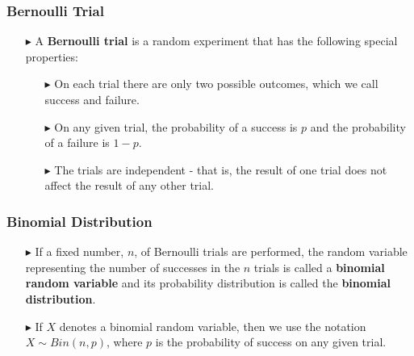\documentclass[12pt]{beamer}
\begin{document}
\begin{frame}
	\frametitle{Bernoulli Trial}
	
	\begin{itemize}
		\item[\color{blue}$\blacktriangleright$] A \textbf{Bernoulli trial} is a random experiment that has the following special properties:
		\begin{itemize}
			\item[\color{blue}$\blacktriangleright$] On each trial there are only two possible outcomes, which we call success and failure.
			\item[\color{blue}$\blacktriangleright$] On any given trial, the probability of a success is $p$ and the probability of a failure is $1 - p$.
			\item[\color{blue}$\blacktriangleright$] The trials are independent - that is, the result of one trial does not affect the result of any other trial.
		\end{itemize}
	\end{itemize}
	
\end{frame}

\begin{frame}
	\frametitle{Binomial Distribution}
	
	\begin{itemize}
		\item[\color{blue}$\blacktriangleright$] If a fixed number, $n$, of Bernoulli trials are performed, the random variable representing the number of successes in the $n$ trials is called a \textbf{binomial random variable} and its probability distribution is called the \textbf{binomial distribution}.
		
		\item[\color{blue}$\blacktriangleright$] If $X$ denotes a binomial random variable, then we use the notation $X \sim Bin(n, p)$, where $p$ is the probability of success on any given trial.
	\end{itemize}
	
\end{frame}
\end{document}
